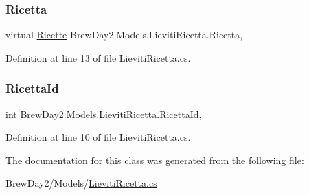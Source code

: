 \mbox{\label{class_brew_day2_1_1_models_1_1_lieviti_ricetta_a61ce97f1cb0a7f7f97ef9c8f01d708bf}} 
\subsubsection{\texorpdfstring{Ricetta}{Ricetta}}
{\footnotesize\ttfamily virtual \mbox{\hyperlink{class_brew_day2_1_1_models_1_1_ricette}{Ricette}} Brew\+Day2.\+Models.\+Lieviti\+Ricetta.\+Ricetta\hspace{0.3cm}{\ttfamily [get]}, {\ttfamily [set]}}



Definition at line 13 of file Lieviti\+Ricetta.\+cs.

\mbox{\label{class_brew_day2_1_1_models_1_1_lieviti_ricetta_a877c7e560b3941ec7a9712630caf43b9}} 
\subsubsection{\texorpdfstring{Ricetta\+Id}{RicettaId}}
{\footnotesize\ttfamily int Brew\+Day2.\+Models.\+Lieviti\+Ricetta.\+Ricetta\+Id\hspace{0.3cm}{\ttfamily [get]}, {\ttfamily [set]}}



Definition at line 10 of file Lieviti\+Ricetta.\+cs.



The documentation for this class was generated from the following file\+:\begin{DoxyCompactItemize}
\item 
Brew\+Day2/\+Models/\mbox{\hyperlink{_lieviti_ricetta_8cs}{Lieviti\+Ricetta.\+cs}}\end{DoxyCompactItemize}
